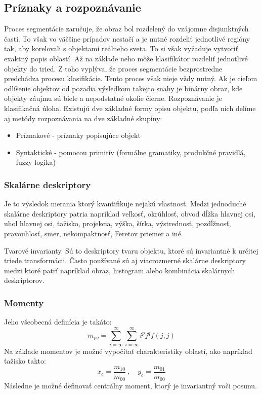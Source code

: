 \subsection{Príznaky a rozpoznávanie}
Proces segmentácie zaručuje, že obraz bol rozdelený do vzájomne disjunktných častí. To však vo väčšine prípadov nestačí a je nutné rozdeliť jednotlivé regióny tak, aby korelovali s objektami reálneho sveta. To si však vyžaduje vytvoriť exaktný popis oblastí. Až na základe neho môže klasifikátor rozdeliť jednotlivé objekty do tried.  Z toho vyplýva, že proces segmentácie bezprostredne predchádza procesu klasifikácie.  Tento proces však nieje vždy nutný. Ak je cieľom odlíšenie objektov od pozadia výsledkom takejto snahy je binárny obraz, kde objekty záujmu sú biele a nepodstatné okolie čierne.
Rozpoznávanie je klasifikačná úloha. Existujú dve základné formy opisu objektu, podľa nich delíme aj metódy rozpoznávania na dve základné skupiny: 

\begin{itemize}
\item Príznakové - príznaky popisujúce objekt 
\item Syntaktické - pomocou primitív (formálne gramatiky, produkčné pravidlá, fuzzy logika)
\end{itemize}

\subsubsection{Skalárne deskriptory}
Je to výsledok merania ktorý kvantifikuje nejakú vlastnosť. Medzi jednoduché skalárne deskriptory  patria napríklad veľkosť,  okrúhlosť, obvod dĺžka hlavnej osi, uhol hlavnej osi, ťažisko,  projekcia, výška, šírka, výstrednosť, pozdĺžnosť, pravouhlosť, smer, nekompaktnosť, Feretov priemer a iné. 

Tvarové invarianty. Sú to deskriptory tvaru objektu, ktoré sú invariantné k určitej triede transformácii.
Často používané sú aj viacrozmerné skalárne deskriptory medzi ktoré patrí napríklad obraz, histogram alebo kombinácia skalárnych deskriptorov.

\subsubsection{Momenty}

Jeho všeobecná definícia je takáto:
$$m_{pq}=\sum_{i=\infty}^\infty \sum_{i=\infty}^\infty i^p j^q f(j,j)$$
Na základe momentov je možné vypočítať charakteristiky oblastí, ako napríklad ťažisko takto: 
$$x_c=\frac{m_{10}}{m_{00}}\ {,}\quad y_c=\frac{m_{01}}{m_{00}}$$
Následne je možné definovať centrálny moment, ktorý je invariantný voči posunu. 



